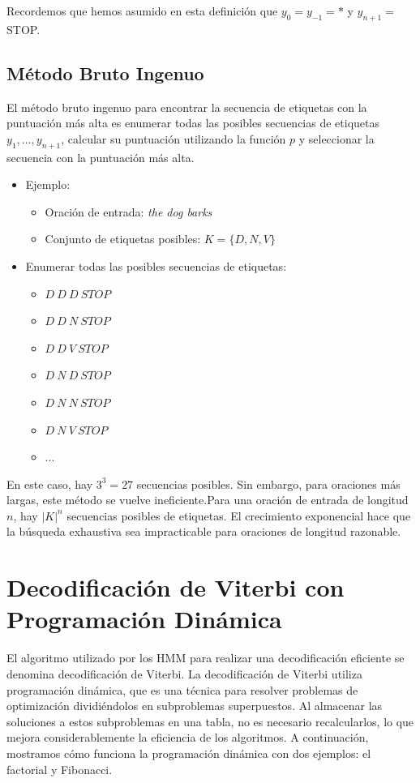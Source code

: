 Recordemos que hemos asumido en esta definición que $y_0 = y_{-1} = *$ y $y_{n+1} =$ STOP.

\subsection{Método Bruto Ingenuo}

El método bruto ingenuo para encontrar la secuencia de etiquetas con la puntuación más alta es enumerar todas las posibles secuencias de etiquetas $y_1, \ldots, y_{n+1}$, calcular su puntuación utilizando la función $p$ y seleccionar la secuencia con la puntuación más alta.

\begin{itemize}
    \item Ejemplo:
    \begin{itemize}
        \item Oración de entrada: \textit{the dog barks}
        \item Conjunto de etiquetas posibles: $K = \{D, N, V\}$
    \end{itemize}
    
    \item Enumerar todas las posibles secuencias de etiquetas:
    \begin{itemize}
        \item $D\ D\ D\ STOP$
        \item $D\ D\ N\ STOP$
        \item $D\ D\ V\ STOP$
        \item $D\ N\ D\ STOP$
        \item $D\ N\ N\ STOP$
        \item $D\ N\ V\ STOP$
        \item ...
    \end{itemize}
\end{itemize} 
  
 En este caso, hay $3^3 = 27$ secuencias posibles. Sin embargo, para oraciones más largas, este método se vuelve ineficiente.Para una oración de entrada de longitud $n$, hay $|K|^n$ secuencias posibles de etiquetas. El crecimiento exponencial hace que la búsqueda exhaustiva sea impracticable para oraciones de longitud razonable.

\section{Decodificación de Viterbi con Programación Dinámica}

El algoritmo utilizado por los HMM para realizar una decodificación eficiente se denomina decodificación de Viterbi. La decodificación de Viterbi utiliza programación dinámica, que es una técnica para resolver problemas de optimización dividiéndolos en subproblemas superpuestos. Al almacenar las soluciones a estos subproblemas en una tabla, no es necesario recalcularlos, lo que mejora considerablemente la eficiencia de los algoritmos. A continuación, mostramos cómo funciona la programación dinámica con dos ejemplos: el factorial y Fibonacci.

